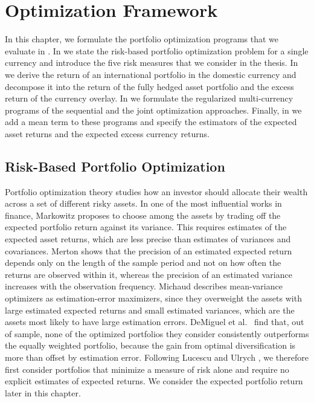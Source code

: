 \chapter{Optimization Framework} 
\label{chap:optimization-framework}

In this chapter, we formulate the portfolio optimization programs that we evaluate in
. In  we state the risk-based
portfolio optimization problem for a single currency and introduce the five risk measures that we consider in the thesis. In  we derive the return of an international
portfolio in the domestic currency and decompose it into the return of the fully hedged asset portfolio and the excess
return of the currency overlay. In  we formulate the regularized multi-currency
programs of the sequential and the joint optimization approaches. Finally, in
 we add a mean term to these programs and specify the estimators 
of the expected asset returns and the expected excess currency returns.

\section{Risk-Based Portfolio Optimization}\label{sec:risk-based-optimization}

Portfolio optimization theory studies how an investor should allocate their wealth across a set of different risky assets. In one of the most 
influential works in finance, Markowitz \cite{Markowitz1952} proposes to choose among the assets by trading off the expected
portfolio return against its variance. This requires estimates of the expected asset returns, which are
less precise than estimates of variances and covariances. Merton \cite{Merton1980} shows that the precision
of an estimated expected return depends only on the length of the sample period and not on how often the returns are
observed within it, whereas the precision of an estimated variance increases with the observation frequency. Michaud
\cite{Michaud1989} describes mean-variance optimizers as estimation-error maximizers, since they overweight the assets
with large estimated expected returns and small estimated variances, which are the assets most likely to have large
estimation errors. DeMiguel et al.~\cite{DeMiguelGarlappiUppal2009} find that, out of sample, none of the optimized
portfolios they consider consistently outperforms the equally weighted portfolio, because the gain from optimal
diversification is more than offset by estimation error. Following Lucescu and Ulrych
\cite{RegularizedMultiCurrencyExpectedShortfallPortfolios}, we therefore first consider portfolios that minimize a
measure of risk alone and require no explicit estimates of expected returns. We consider the expected portfolio return later in
this chapter.

